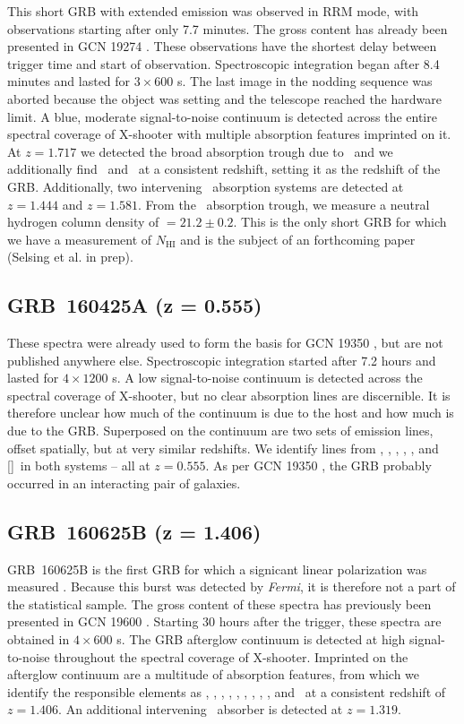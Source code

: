 \documentclass[longauth]{aa}    %
\begin{document}
This short GRB with extended emission \citep[GCN 19276;][]{GCN19276} was
observed in RRM mode, with observations starting after only 7.7 minutes. The
gross content has already been presented in GCN 19274 \citep{GCN19274}. These
observations have the shortest delay between trigger time and start of
observation. Spectroscopic integration began after 8.4 minutes and lasted for $3
\times 600$ s. The last image in the nodding sequence was aborted because the
object was setting and the telescope reached the hardware limit. A blue,
moderate signal-to-noise continuum is detected across the entire spectral
coverage of X-shooter with multiple absorption features imprinted on it. At $z =
1.717$ we detected the broad absorption trough due to \lya~and we additionally
find \alii~and \feii~at a consistent redshift, setting it as the redshift of the
GRB. Additionally, two intervening \civ~absorption systems are detected at  $z =
1.444$ and $z = 1.581$. From the \lya~absorption trough, we measure a neutral
hydrogen column density of \nh$= 21.2 \pm 0.2$. This is the only short GRB for
which we have a measurement of $N_{\mathrm{HI}}$ and is the subject of an
forthcoming paper (Selsing et al. in prep).

\subsection{GRB~160425A (z = 0.555)}\label{160425}

These spectra were already used to form the basis for GCN 19350
\citep{GCN19350}, but are not published anywhere else. Spectroscopic integration
started after 7.2 hours and lasted for $4 \times 1200$ s. A low signal-to-noise
continuum is detected across the spectral coverage of X-shooter, but no clear
absorption lines are discernible. It is therefore unclear how much of the
continuum is due to the host and how much is due to the GRB. Superposed on the
continuum are two sets of emission lines, offset spatially, but at very similar
redshifts. We identify lines from \oii, \hb, \oiii, \ha, \niil, and [\sii]~in both
systems -- all at $z = 0.555$. As per GCN 19350 \citep{GCN19350}, the GRB
probably occurred in an interacting pair of galaxies.

\subsection{GRB~160625B (z = 1.406)}\label{160625}

GRB~160625B is the first GRB for which a signicant linear polarization was
measured \citep{Troja2017}. Because this burst was detected by \textit{Fermi}, it
is therefore not a part of the statistical sample. The gross content of these
spectra has previously been presented in GCN 19600 \citep{GCN19600}. Starting 30
hours after the trigger, these spectra are obtained in $4 \times 600$ s. The GRB
afterglow continuum is detected at high signal-to-noise throughout the spectral
coverage of X-shooter. Imprinted on the afterglow continuum are a multitude of
absorption features, from which we identify the responsible elements as \SIii,
\oi, \SIiv, \civ, \alii, \aliii, \feii, \znii, \mgii, and \mgi~at a consistent
redshift of $z = 1.406$. An additional intervening \mgii~absorber is detected at
$z = 1.319$.
\end{document}
